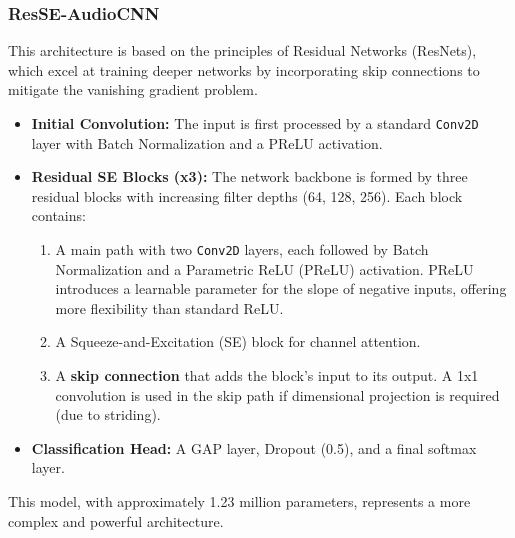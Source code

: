 \documentclass[11pt,a4paper]{article}
\begin{document}
\subsubsection{ResSE-AudioCNN}
This architecture is based on the principles of Residual Networks (ResNets), which excel at training deeper networks by incorporating skip connections to mitigate the vanishing gradient problem.
\begin{itemize}
    \item \textbf{Initial Convolution:} The input is first processed by a standard \texttt{Conv2D} layer with Batch Normalization and a PReLU activation.
    \item \textbf{Residual SE Blocks (x3):} The network backbone is formed by three residual blocks with increasing filter depths (64, 128, 256). Each block contains:
    \begin{enumerate}
        \item A main path with two \texttt{Conv2D} layers, each followed by Batch Normalization and a Parametric ReLU (PReLU) activation. PReLU introduces a learnable parameter for the slope of negative inputs, offering more flexibility than standard ReLU.
        \item A Squeeze-and-Excitation (SE) block for channel attention.
        \item A \textbf{skip connection} that adds the block's input to its output. A 1x1 convolution is used in the skip path if dimensional projection is required (due to striding).
    \end{enumerate}
    \item \textbf{Classification Head:} A GAP layer, Dropout (0.5), and a final softmax layer.
\end{itemize}
This model, with approximately 1.23 million parameters, represents a more complex and powerful architecture.
\end{document}
